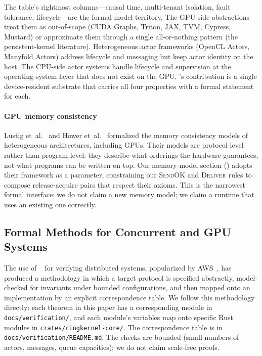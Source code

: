 The table's rightmost columns—causal time, multi-tenant isolation,
fault tolerance, lifecycle—are the formal-model territory.  The
GPU-side abstractions treat them as out-of-scope (CUDA Graphs,
Triton, JAX, TVM, Cypress, Mustard) or approximate them through a
single all-or-nothing pattern (the persistent-kernel literature).
Heterogeneous actor frameworks (OpenCL Actors, Manyfold Actors)
address lifecycle and messaging but keep actor identity on the
host.  The CPU-side actor systems handle lifecycle and supervision
at the operating-system layer that does not exist on the GPU.
\system{}'s contribution is a single device-resident substrate that
carries all four properties with a formal statement for each.

\paragraph{GPU memory consistency}
Lustig et~al.~\citep{lustig2014abstraction} and Hower
et~al.~\citep{hower2014} formalized the memory consistency models of
heterogeneous architectures, including GPUs.  Their models are
protocol-level rather than program-level: they describe what
orderings the hardware guarantees, not what programs can be written
on top.  Our memory-model section ()
adopts their framework as a parameter, constraining our
\textsc{SendOK} and \textsc{Deliver} rules to compose
release-acquire pairs that respect their axioms.  This is the
narrowest formal interface: we do not claim a new memory model;
we claim a runtime that uses an existing one correctly.

\subsection{Formal Methods for Concurrent and GPU Systems}
\label{sec:rw:formal}

The use of \TLA{}~\citep{lamport2002} for verifying distributed
systems, popularized by AWS~\citep{newcombe2014}, has produced a
methodology in which a target protocol is specified abstractly,
model-checked for invariants under bounded configurations, and then
mapped onto an implementation by an explicit correspondence
table.  We follow this methodology directly: each theorem in this
paper has a corresponding \TLA{} module in
\texttt{docs/verification/}, and each module's variables map onto
specific Rust modules in \texttt{crates/ringkernel-core/}.  The
correspondence table is in \texttt{docs/verification/README.md}.
The checks are bounded (small numbers of actors, messages, queue
capacities); we do not claim scale-free proofs.

